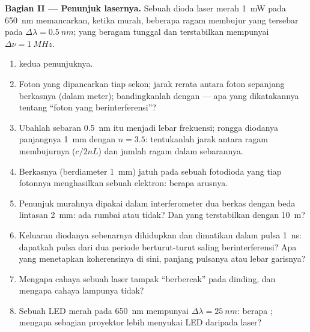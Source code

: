 \begin{problem}
\medskip
\noindent\textbf{Bagian II --- Penunjuk lasernya.}
Sebuah dioda laser merah \qty{1}{mW} pada \qty{650}{nm} memancarkan, ketika murah, beberapa
ragam membujur yang tersebar pada $\Delta\lambda = \qty{0.5}{nm}$; yang beragam tunggal dan
terstabilkan mempunyai $\Delta\nu = \qty{1}{MHz}$.
\begin{enumerate}[resume]
  \item {} kedua penunjuknya.
  \item Foton yang dipancarkan tiap sekon; jarak rerata antara foton sepanjang
        berkasnya (dalam meter); bandingkanlah dengan  ---
        apa yang dikatakannya tentang ``foton yang berinterferensi''?
  \item Ubahlah sebaran \qty{0.5}{nm} itu menjadi lebar frekuensi; rongga
        diodanya panjangnya \qty{1}{mm} dengan $n = 3.5$: tentukanlah jarak antara ragam
        membujurnya ($c/2nL$) dan jumlah ragam dalam sebarannya.
  \item Berkasnya (berdiameter \qty{1}{mm}) jatuh pada sebuah fotodioda yang
        tiap fotonnya menghasilkan sebuah elektron: berapa arusnya.
  \item Penunjuk murahnya dipakai dalam interferometer dua berkas dengan
        beda lintasan \qty{2}{mm}: ada rumbai atau tidak? Dan yang terstabilkan
        dengan \qty{10}{m}?
  \item Keluaran diodanya sebenarnya dihidupkan dan dimatikan dalam
        pulsa \qty{1}{ns}: dapatkah pulsa dari dua periode berturut-turut
        saling berinterferensi? Apa yang menetapkan koherensinya di sini,
        panjang pulsanya atau lebar garisnya?
  \item Mengapa cahaya sebuah laser tampak ``berbercak'' pada dinding, dan mengapa
        cahaya lampunya tidak?
  \item Sebuah LED merah pada \qty{650}{nm} mempunyai $\Delta\lambda = \qty{25}{nm}$: berapa ; mengapa sebagian proyektor lebih menyukai LED daripada laser?
\end{enumerate}


\end{problem}

